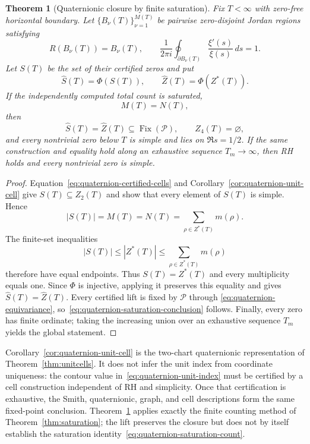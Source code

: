 \documentclass[11pt]{amsart}
\newtheorem{theorem}{Theorem}[section]
\theoremstyle{definition}
\theoremstyle{remark}
\begin{document}
\begin{theorem}[Quaternionic closure by finite saturation]
\label{thm:quaternion-saturation}
Fix $T<\infty$ with zero-free horizontal boundary.  Let
$\{B_\nu(T)\}_{\nu=1}^{M(T)}$ be pairwise zero-disjoint Jordan regions satisfying
\begin{equation}\label{eq:quaternion-certified-cells}
 R(B_\nu(T))=B_\nu(T),
 \qquad
 \frac{1}{2\pi i}\oint_{\partial B_\nu(T)}
       \frac{\xi'(s)}{\xi(s)}\,ds=1.
\end{equation}
Let $S(T)$ be the set of their certified zeros and put
\begin{equation}\label{eq:quaternion-certified-lifts}
 \widehat S(T)=\Phi(S(T)),
 \qquad
 \widehat Z(T)=\Phi(Z^*(T)).
\end{equation}
If the independently computed total count is saturated,
\begin{equation}\label{eq:quaternion-saturation-count}
 M(T)=N(T),
\end{equation}
then
\begin{equation}\label{eq:quaternion-saturation-conclusion}
 \widehat S(T)=\widehat Z(T)
 \subseteq\operatorname{Fix}(\mathcal P),
 \qquad Z_4(T)=\varnothing,
\end{equation}
and every nontrivial zero below $T$ is simple and lies on $\Re s=1/2$.
If the same construction and equality hold along an exhaustive sequence
$T_m\to\infty$, then RH holds and every nontrivial zero is simple.
\end{theorem}
\begin{proof}
Equation~\eqref{eq:quaternion-certified-cells} and
Corollary~\ref{cor:quaternion-unit-cell} give
$S(T)\subseteq Z_2(T)$ and show that every element of $S(T)$ is simple.  Hence
\[
 |S(T)|=M(T)=N(T)=\sum_{\rho\in Z^*(T)}m(\rho).
\]
The finite-set inequalities
\[
 |S(T)|\le |Z^*(T)|\le
 \sum_{\rho\in Z^*(T)}m(\rho)
\]
therefore have equal endpoints.  Thus $S(T)=Z^*(T)$ and every multiplicity equals one.
Since $\Phi$ is injective, applying it preserves this equality and gives
$\widehat S(T)=\widehat Z(T)$.  Every certified lift is fixed by $\mathcal P$ through
\eqref{eq:quaternion-equivariance}, so~\eqref{eq:quaternion-saturation-conclusion} follows.
Finally, every zero has finite ordinate; taking the increasing union over an exhaustive
sequence $T_m$ yields the global statement.
\end{proof}

Corollary~\ref{cor:quaternion-unit-cell} is the two-chart quaternionic representation of
Theorem~\ref{thm:unitcells}.  It does not infer the unit index from coordinate uniqueness:
the contour value in~\eqref{eq:quaternion-unit-index} must be certified by a cell construction
independent of RH and simplicity.  Once that certification is exhaustive, the Smith,
quaternionic, graph, and cell descriptions form the same fixed-point conclusion.
Theorem~\ref{thm:quaternion-saturation} applies exactly the finite counting method of
Theorem~\ref{thm:saturation}; the lift preserves the closure but does not by itself establish
the saturation identity~\eqref{eq:quaternion-saturation-count}.
\end{document}

